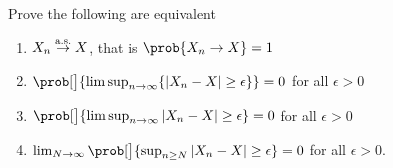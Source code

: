 
\begin{exercise}[subtitle={Further characterize almost sure convergence \Coffeecup}]
    Prove the following are equivalent
    \begin{enumerate}[label=(\roman*), noitemsep]
        \item\label{it: as convergence} \(X_n \overset{\operatorname{\text{a.s.}}}\to X\), that is \(\prob{X_n \to X} =1\)
        \item\label{it: limsup set convergence} \(\prob[\big]{\limsup_{n \to \infty} \set{|X_n - X| \ge \epsilon}} = 0\) for all \(\epsilon > 0\)
        \item\label{it: limsup convergence} \(\prob[\big]{\limsup_{n \to \infty} |X_n - X| \ge \epsilon} = 0\) for all \(\epsilon >0\)
        \item\label{it: sup convergence} \(\lim_{N\to \infty} \prob[\big]{\sup_{n \ge N} |X_n - X| \ge \epsilon} = 0\) for all \(\epsilon > 0\).
    \end{enumerate}
\end{exercise}

